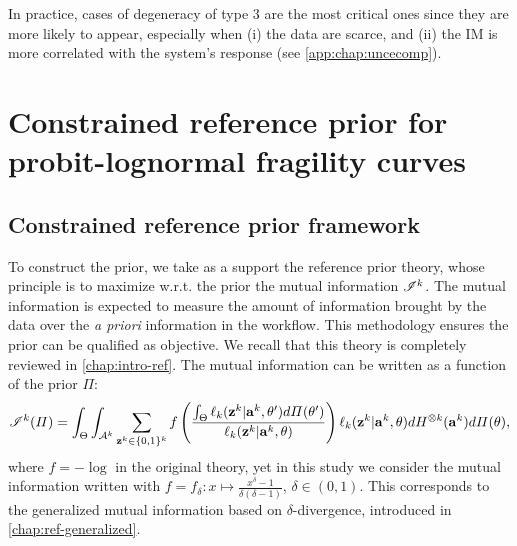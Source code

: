 In practice, cases of degeneracy of type 3 are the most critical ones since they are more likely to appear, especially when (i) the data are scarce, and (ii) the IM is more correlated with the system's response (see   \cref{app:chap:uncecomp}).


\section{Constrained reference prior for probit-lognormal fragility curves}\label{sec:constr-frags:constrained}


\subsection{Constrained reference prior framework}\label{sec:constr-frags:subsec-constr-frame}



To construct the prior, we take as a support the reference prior theory, whose principle is to maximize w.r.t. the prior the mutual information $\mathscr{I}^k$. The mutual information is expected to measure the amount of information brought by the data over the \emph{a priori} information in the workflow. This methodology ensures the prior can be qualified as objective. We recall that this theory is completely reviewed in   \cref{chap:intro-ref}.
The mutual information can be written as a function of the prior $\varPi$:
\begin{equation}\label{eq:constr-frag:MI}
    \mathscr{I}^k(\varPi) = \int_{\Theta}\int_{\mathcal{A}^k}\sum_{\mathbf{z}^k\in\{0,1\}^k}f\left(\frac{\int_\Theta\ell_k(\mathbf{z}^k|\mathbf{a}^k,\theta')d\varPi(\theta')  }{\ell_k(\mathbf{z}^k|\mathbf{a}^k,\theta)}\right)\ell_k(\mathbf{z}^k|\mathbf{a}^k,\theta)dH^{\otimes k}(\mathbf{a}^k)d\varPi(\theta)  ,    
\end{equation}
where $f=-\log$ in the original theory, yet in this study we consider the mutual information written with $f=f_\delta:x\mapsto\frac{x^\delta-1}{\delta(\delta-1)}$, $\delta\in(0,1)$.
This corresponds to the generalized mutual information 
based on $\delta$-divergence, introduced in   \cref{chap:ref-generalized}. 

